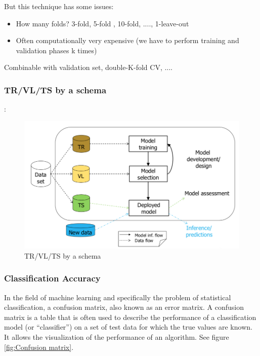 \documentclass[../main.tex]{subfiles}
\begin{document}
But this technique has some issues: 
\begin{itemize}
    \item How many folds? 3-fold, 5-fold , 10-fold, ...., 1-leave-out
    \item Often computationally very expensive (we have to perform training and validation phases k times)
\end{itemize}

Combinable with validation set, double-K-fold CV, ....


\subsubsection{TR/VL/TS by a schema}:
\begin{figure}[H]
    \centering
    \includegraphics[scale = 0.37]{lectures/1_Introduction/intro_cross_valid_schema.png}
    \caption{TR/VL/TS by a schema}
    \label{fig:intro_cross_valid_schema}
\end{figure}

\subsubsection{Classification Accuracy}
In the field of machine learning and specifically the problem of statistical classification, a confusion matrix, also known as an error matrix.
A confusion matrix is a table that is often used to describe the performance of a classification model (or “classifier”) on a set of test data for which the true values are known. It allows the visualization of the performance of an algorithm. See figure \ref{fig:Confusion matrix}.
\end{document}
